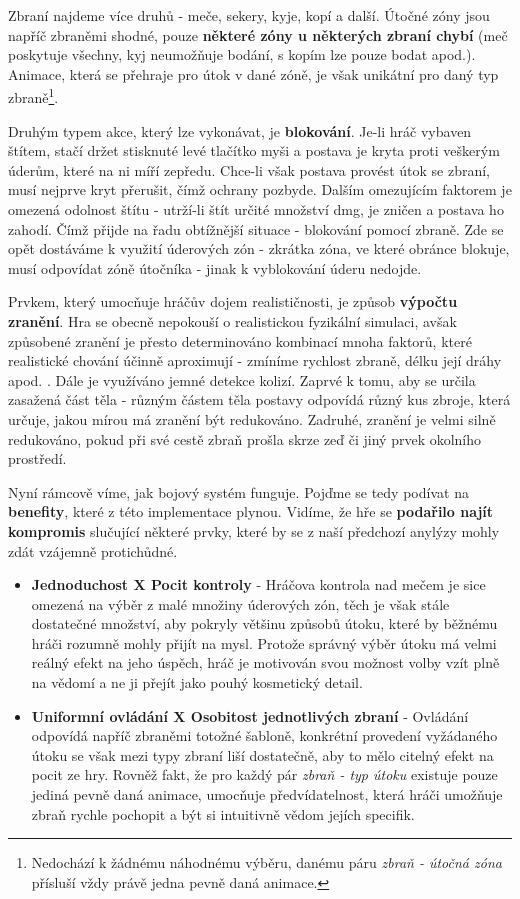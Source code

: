 Zbraní najdeme více druhů - meče, sekery, kyje, kopí a další. Útočné zóny jsou napříč zbraněmi shodné, pouze \textbf{některé zóny u některých zbraní chybí} (meč poskytuje všechny, kyj neumožňuje bodání, s kopím lze pouze bodat apod.). Animace, která se přehraje pro útok v dané zóně, je však unikátní pro daný typ zbraně\footnote{Nedochází k žádnému náhodnému výběru, danému páru \textit{zbraň - útočná zóna} přísluší vždy právě jedna pevně daná animace.}.

Druhým typem akce, který lze vykonávat, je \textbf{blokování}. Je-li hráč vybaven štítem, stačí držet stisknuté levé tlačítko myši a postava je kryta proti veškerým úderům, které na ni míří zepředu. Chce-li však postava provést útok se zbraní, musí nejprve kryt přerušit, čímž ochrany pozbyde. Dalším omezujícím faktorem je omezená odolnost štítu - utrží-li štít určité množství \acs{dmg}, je zničen a postava ho zahodí. Čímž přijde na řadu obtížnější situace - blokování pomocí zbraně. Zde se opět dostáváme k využití úderových zón - zkrátka zóna, ve které obránce blokuje, musí odpovídat zóně útočníka - jinak k vyblokování úderu nedojde.

Prvkem, který umocňuje hráčův dojem realističnosti, je způsob \textbf{výpočtu zranění}. Hra se obecně nepokouší o realistickou fyzikální simulaci, avšak způsobené zranění je přesto determinováno kombinací mnoha faktorů, které realistické chování účinně aproximují - zmíníme rychlost zbraně, délku její dráhy apod. . Dále je využíváno jemné detekce kolizí. Zaprvé k tomu, aby se určila zasažená část těla - různým částem těla postavy odpovídá různý kus zbroje, která určuje, jakou mírou má zranění být redukováno. Zadruhé, zranění je velmi silně redukováno, pokud při své cestě zbraň prošla skrze zeď či jiný prvek okolního prostředí. 

Nyní rámcově víme, jak bojový systém funguje. Pojďme se tedy podívat na \textbf{benefity}, které z této implementace plynou. Vidíme, že hře se \textbf{podařilo najít kompromis} slučující některé prvky, které by se z naší předchozí anylýzy mohly zdát vzájemně protichůdné.
\begin{itemize}
    \item \textbf{Jednoduchost X Pocit kontroly} - Hráčova kontrola nad mečem je sice omezená na výběr z malé množiny úderových zón, těch je však stále dostatečné množství, aby pokryly většinu způsobů útoku, které by běžnému hráči rozumně mohly přijít na mysl. Protože správný výběr útoku má velmi reálný efekt na jeho úspěch, hráč je motivován svou možnost volby vzít plně na vědomí a ne ji přejít jako pouhý kosmetický detail. 
    \item \textbf{Uniformní ovládání X Osobitost jednotlivých zbraní} - Ovládání odpovídá napříč zbraněmi totožné šabloně, konkrétní provedení vyžádaného útoku se však mezi typy zbraní liší dostatečně, aby to mělo citelný efekt na pocit ze hry. Rovněž fakt, že pro každý pár \textit{zbraň - typ útoku} existuje pouze jediná pevně daná animace, umocňuje předvídatelnost, která hráči umožňuje zbraň rychle pochopit a být si intuitivně vědom jejích specifik.
\end{itemize}

